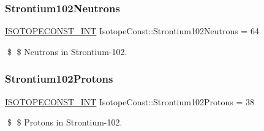 \subsubsection{\texorpdfstring{Strontium102\+Neutrons}{Strontium102Neutrons}}
{\footnotesize\ttfamily \mbox{\hyperlink{group___isotope_const-_macros_ga5f18360b3e99483a35c32d789e62621c}{I\+S\+O\+T\+O\+P\+E\+C\+O\+N\+S\+T\+\_\+\+I\+NT}} Isotope\+Const\+::\+Strontium102\+Neutrons = 64}

\$ \$ Neutrons in Strontium-\/102. \mbox{\label{group___isotope_const-_strontium-_sr102_gae9ac799915c261d575805808663b7c06}} 
\subsubsection{\texorpdfstring{Strontium102\+Protons}{Strontium102Protons}}
{\footnotesize\ttfamily \mbox{\hyperlink{group___isotope_const-_macros_ga5f18360b3e99483a35c32d789e62621c}{I\+S\+O\+T\+O\+P\+E\+C\+O\+N\+S\+T\+\_\+\+I\+NT}} Isotope\+Const\+::\+Strontium102\+Protons = 38}

\$ \$ Protons in Strontium-\/102. 